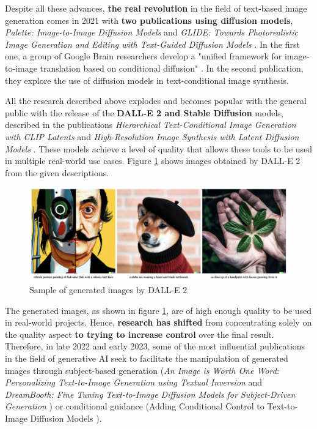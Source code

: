 Despite all these advances, \textbf{the real revolution} in the field of text-based image generation comes in 2021 with \textbf{two publications using diffusion models}, \textit{Palette: Image-to-Image Diffusion Models} \cite{saharia2022palette} and \textit{GLIDE: Towards Photorealistic Image Generation and Editing with Text-Guided Diffusion Models} \cite{nichol2021glide}. In the first one, a group of Google Brain researchers develop a "unified framework for image-to-image translation based on conditional diffusion" \cite{saharia2022palette}. In the second publication, they explore the use of diffusion models in text-conditional image synthesis. 

All the research described above explodes and becomes popular with the general public with the release of the \textbf{DALL-E 2 and Stable Diffusion} models, described in the publications \textit{Hierarchical Text-Conditional Image Generation with CLIP Latents} \cite{ramesh2022hierarchical} and \textit{High-Resolution Image Synthesis with Latent Diffusion Models} \cite{rombach2022high}. These models achieve a level of quality that allows these tools to be used in multiple real-world use cases. Figure \ref{fig:DallE2} shows images obtained by DALL-E 2 from the given descriptions. 

\begin{figure}
    \centering
    \includegraphics[width=1\textwidth]{Pictures/DallE2.png} 
    \caption{Sample of generated images by DALL-E 2 \cite{ramesh2022hierarchical}}
    \label{fig:DallE2}
\end{figure}

The generated images, as shown in figure \ref{fig:DallE2}, are of high enough quality to be used in real-world projects. Hence, \textbf{research has shifted} from concentrating solely on the quality aspect \textbf{to trying to increase control} over the final result. Therefore, in late 2022 and early 2023, some of the most influential publications in the field of generative AI seek to facilitate the manipulation of generated images through subject-based generation (\textit{\textit{An Image is Worth One Word: Personalizing Text-to-Image Generation using Textual Inversion}} \cite{gal2022image} and \textit{DreamBooth: Fine Tuning Text-to-Image Diffusion Models for Subject-Driven Generation} \cite{ruiz2022dreambooth}) or conditional guidance (Adding Conditional Control to Text-to-Image Diffusion Models \cite{zhang2023adding}).

